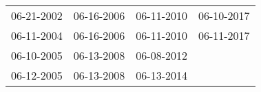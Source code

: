 \begin{supertabular}{llll}
 06-21-2002 &  06-16-2006 &  06-11-2010 &  06-10-2017 \\
 06-11-2004 &  06-16-2006 &  06-11-2010 &  06-11-2017 \\
 06-10-2005 &  06-13-2008 &  06-08-2012 &             \\
 06-12-2005 &  06-13-2008 &  06-13-2014 &             \\
\end{supertabular}
